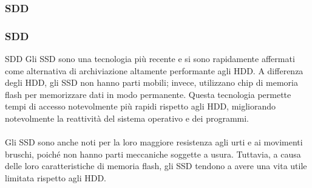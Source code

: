 \subsubsection[SDD]{SDD}
\begin{frame}
	\frametitle{SDD}
	  
	\begin{block}{SDD}
		Gli SSD sono una tecnologia più recente e si sono rapidamente affermati come alternativa di archiviazione altamente performante agli HDD. A differenza degli HDD, gli SSD non hanno parti mobili; invece, utilizzano chip di memoria flash per memorizzare dati in modo permanente. Questa tecnologia permette tempi di accesso notevolmente più rapidi rispetto agli HDD, migliorando notevolmente la reattività del sistema operativo e dei programmi.\\~\\
		Gli SSD sono anche noti per la loro maggiore resistenza agli urti e ai movimenti bruschi, poiché non hanno parti meccaniche soggette a usura. Tuttavia, a causa delle loro caratteristiche di memoria flash, gli SSD tendono a avere una vita utile limitata rispetto agli HDD.
	\end{block}
\end{frame}


